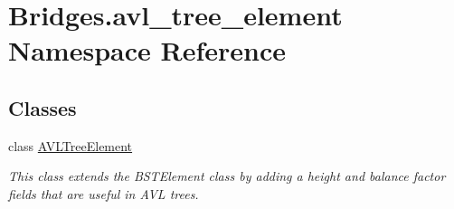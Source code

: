 \hypertarget{namespace_bridges_1_1avl__tree__element}{}\section{Bridges.\+avl\+\_\+tree\+\_\+element Namespace Reference}
\label{namespace_bridges_1_1avl__tree__element}
\subsection*{Classes}
\begin{DoxyCompactItemize}
\item 
class \hyperlink{class_bridges_1_1avl__tree__element_1_1_a_v_l_tree_element}{A\+V\+L\+Tree\+Element}
\begin{DoxyCompactList}\small\item\em This class extends the B\+S\+T\+Element class by adding a height and balance factor fields that are useful in A\+V\+L trees. \end{DoxyCompactList}\end{DoxyCompactItemize}
